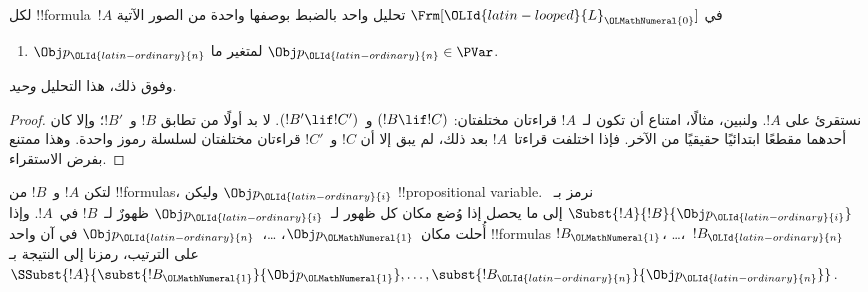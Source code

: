 \documentclass[../../../include/open-logic-section]{subfiles}
\begin{document}
\begin{prop}
لكل !!{formula}~$!A$ في $ \Frm[{\OLId{latin-looped}{L}}_{\OLMathNumeral{0}}]$ تحليل واحد بالضبط بوصفها واحدة من
الصور الآتية
\begin{enumerate}


\item $\Obj p_{\OLId{latin-ordinary}{n}}$ لمتغير ما $\Obj p_{\OLId{latin-ordinary}{n}} \in  \PVar$.





\end{enumerate}
وفوق ذلك، هذا التحليل \emph{وحيد}.
\end{prop}

\begin{proof}
نستقرئ على $!A$. ولنبين، مثالًا، امتناع أن تكون لـ~$!A$ قراءتان مختلفتان:
$(!B \lif !C)$ و~$(!B' \lif !C')$. لا بد أولًا من تطابق $!B$ و~$!B'$؛ وإلا كان أحدهما مقطعًا ابتدائيًا حقيقيًا من الآخر. فإذا اختلفت قراءتا~$!A$ بعد ذلك، لم يبق إلا أن $!C$ و~$!C'$ قراءتان مختلفتان لسلسلة رموز واحدة. وهذا ممتنع بفرض الاستقراء.
\end{proof}

\begin{defn}
لتكن $!A$ و~$!B$ من !!{formula}s، وليكن $\Obj p_{\OLId{latin-ordinary}{i}}$ !!{propositional
variable}. نرمز بـ~$\Subst{!A}{!B}{\Obj p_{\OLId{latin-ordinary}{i}}}$ إلى ما يحصل إذا وُضع مكان كل ظهور لـ~$\Obj p_{\OLId{latin-ordinary}{i}}$ ظهورٌ لـ~$!B$ في~$!A$.
وإذا أُحلت مكان~$\Obj p_{\OLMathNumeral{1}}$، \dots،~$\Obj p_{\OLId{latin-ordinary}{n}}$ في آن واحد
!!{formula}s $!B_{\OLMathNumeral{1}}$، \dots،~$!B_{\OLId{latin-ordinary}{n}}$ على الترتيب، رمزنا إلى النتيجة بـ
$\SSubst{!A}{\subst{!B_{\OLMathNumeral{1}}}{\Obj p_{\OLMathNumeral{1}}},\dots,\subst{!B_{\OLId{latin-ordinary}{n}}}{\Obj p_{\OLId{latin-ordinary}{n}}}}$.
\end{defn}
\end{document}
